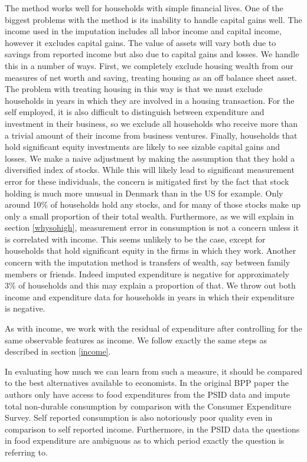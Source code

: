 \documentclass[titlepage]{\econtex}\newcommand{\texname}{IncomeUncertainty}
\begin{document}
The method works well for households with simple financial lives. One of the biggest problems with the method is its inability to handle capital gains well. The income used in the imputation includes all labor income and capital income, however it excludes capital gains. The value of assets will vary both due to savings from reported income but also due to capital gains and losses. We handle this in a number of ways. First, we completely exclude housing wealth from our measures of net worth and saving, treating housing as an off balance sheet asset. The problem with treating housing in this way is that we must exclude households in years in which they are involved in a housing transaction. For the self employed, it is also difficult to distinguish between expenditure and investment in their business, so we exclude all households who receive more than a trivial amount of their income from business ventures. Finally, households that hold significant equity investments are likely to see sizable capital gains and losses. We make a naive adjustment by making the assumption that they hold a diversified index of stocks. While this will likely lead to significant measurement error for these individuals, the concern is mitigated first by the fact that stock holding is much more unusual in Denmark than in the US for example. Only around 10\% of households hold any stocks, and for many of those stocks make up only a small proportion of their total wealth. Furthermore, as we will explain in section \ref{whysohigh}, measurement error in consumption is not a concern unless it is correlated with income. This seems unlikely to be the case, except for households that hold significant equity in the firms in which they work. Another concern with the imputation method is transfers of wealth, say between family members or friends. Indeed imputed expenditure is negative for approximately 3\% of households and this may explain a proportion of that. We throw out both income and expenditure data for households in years in which their expenditure is negative.

As with income, we work with the residual of expenditure after controlling for the same observable features as income. We follow exactly the same steps as described in section \ref{income}.

In evaluating how much we can learn from such a measure, it should be compared to the best alternatives available to economists. In the original BPP paper the authors only have access to food expenditures from the PSID data and impute total non-durable consumption by comparison with the Consumer Expenditure Survey. Self reported consumption is also notoriously poor quality even in comparison to self reported income. Furthermore, in the PSID data the questions in food expenditure are ambiguous as to which period exactly the question is referring to.
\end{document}

